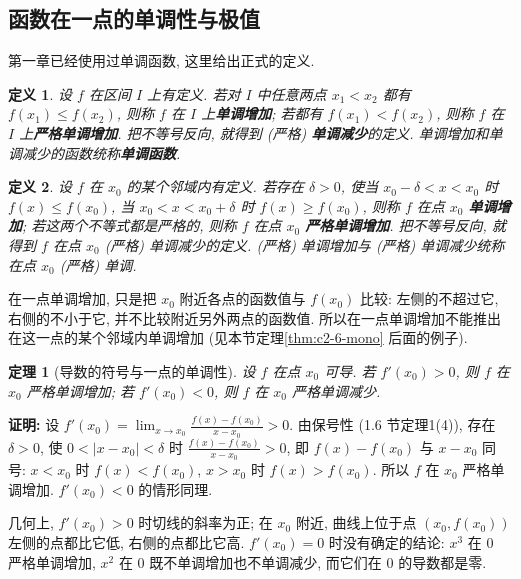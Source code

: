 \documentclass[UTF8,openany]{ctexbook}
\theoremstyle{chinesetextbook}
\newtheorem{definition}{定义}[section]
\newtheorem{theorem}{定理}[section]
\newenvironment{cnproof}{\par\indent\textbf{证明:} \ignorespaces}{\par}
\begin{document}
\subsection{函数在一点的单调性与极值}
第一章已经使用过单调函数, 这里给出正式的定义.
\begin{definition}
设 $f$ 在区间 $I$ 上有定义. 若对 $I$ 中任意两点 $x_1<x_2$ 都有 $f(x_1)\le f(x_2)$, 则称 $f$ 在 $I$ 上\textbf{单调增加}; 若都有 $f(x_1)<f(x_2)$, 则称 $f$ 在 $I$ 上\textbf{严格单调增加}. 把不等号反向, 就得到 (严格) \textbf{单调减少}的定义. 单调增加和单调减少的函数统称\textbf{单调函数}.
\end{definition}
\begin{definition}
设 $f$ 在 $x_0$ 的某个邻域内有定义. 若存在 $\delta>0$, 使当 $x_0-\delta<x<x_0$ 时 $f(x)\le f(x_0)$, 当 $x_0<x<x_0+\delta$ 时 $f(x)\ge f(x_0)$, 则称 $f$ 在点 $x_0$ \textbf{单调增加}; 若这两个不等式都是严格的, 则称 $f$ 在点 $x_0$ \textbf{严格单调增加}. 把不等号反向, 就得到 $f$ 在点 $x_0$ (严格) 单调减少的定义. (严格) 单调增加与 (严格) 单调减少统称在点 $x_0$ (严格) 单调.
\end{definition}
在一点单调增加, 只是把 $x_0$ 附近各点的函数值与 $f(x_0)$ 比较: 左侧的不超过它, 右侧的不小于它, 并不比较附近另外两点的函数值. 所以在一点单调增加不能推出在这一点的某个邻域内单调增加 (见本节定理\ref{thm:c2-6-mono} 后面的例子).
\begin{theorem}[导数的符号与一点的单调性]\label{thm:c2-6-point}
设 $f$ 在点 $x_0$ 可导. 若 $f'(x_0)>0$, 则 $f$ 在 $x_0$ 严格单调增加; 若 $f'(x_0)<0$, 则 $f$ 在 $x_0$ 严格单调减少.
\end{theorem}
\begin{cnproof}
设 $\displaystyle f'(x_0)=\lim_{x\to x_0}\frac{f(x)-f(x_0)}{x-x_0}>0$. 由保号性 (1.6 节定理1(4)), 存在 $\delta>0$, 使 $0<|x-x_0|<\delta$ 时 $\displaystyle\frac{f(x)-f(x_0)}{x-x_0}>0$, 即 $f(x)-f(x_0)$ 与 $x-x_0$ 同号: $x<x_0$ 时 $f(x)<f(x_0)$, $x>x_0$ 时 $f(x)>f(x_0)$. 所以 $f$ 在 $x_0$ 严格单调增加. $f'(x_0)<0$ 的情形同理.
\end{cnproof}
几何上, $f'(x_0)>0$ 时切线的斜率为正; 在 $x_0$ 附近, 曲线上位于点 $(x_0,f(x_0))$ 左侧的点都比它低, 右侧的点都比它高. $f'(x_0)=0$ 时没有确定的结论: $x^3$ 在 $0$ 严格单调增加, $x^2$ 在 $0$ 既不单调增加也不单调减少, 而它们在 $0$ 的导数都是零.
\end{document}

